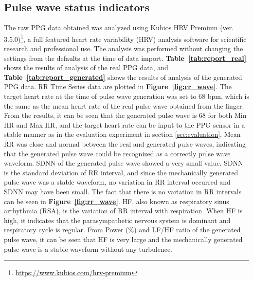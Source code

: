 \documentclass[sigchi,authordraft]{acmart}
\newcommand\figref[1]{\textbf{Figure~\ref{fig:#1}}}
\newcommand\tabref[1]{\textbf{Table~\ref{tab:#1}}}
\begin{document}
\subsection{Pulse wave status indicators}
The raw PPG data obtained was analyzed using Kubios HRV Premium (ver. 3.5.0)\footnote{\url{https://www.kubios.com/hrv-premium}}, a full featured heart rate variability (HRV) analysis software for scientific research and professional use. The analysis was performed without changing the settings from the defaults at the time of data import. \tabref{report_real} shows the results of analysis of the real PPG data, and \tabref{report_generated} shows the results of analysis of the generated PPG data. RR Time Series data are plotted in \figref{rr_wave}. The target heart rate at the time of pulse wave generation was set to 68 bpm, which is the same as the mean heart rate of the real pulse wave obtained from the finger. From the results, it can be seen that the generated pulse wave is 68 for both Min HR and Max HR, and the target heart rate can be input to the PPG sensor in a stable manner as in the evaluation experiment in section \ref{sec:evaluation}. Mean RR was close and normal between the real and generated pulse waves, indicating that the generated pulse wave could be recognized as a correctly pulse wave waveform. SDNN of the generated pulse wave showed a very small value. SDNN is the standard deviation of RR interval, and since the mechanically generated pulse wave was a stable waveform, no variation in RR interval occurred and SDNN may have been small. The fact that there is no variation in RR intervals can be seen in \figref{rr_wave}. HF, also known as respiratory sinus arrhythmia (RSA), is the variation of RR interval with respiration. When HF is high, it indicates that the parasympathetic nervous system is dominant and respiratory cycle is regular. From Power (\%) and LF/HF ratio of the generated pulse wave, it can be seen that HF is very large and the mechanically generated pulse wave is a stable waveform without any turbulence.
\end{document}
